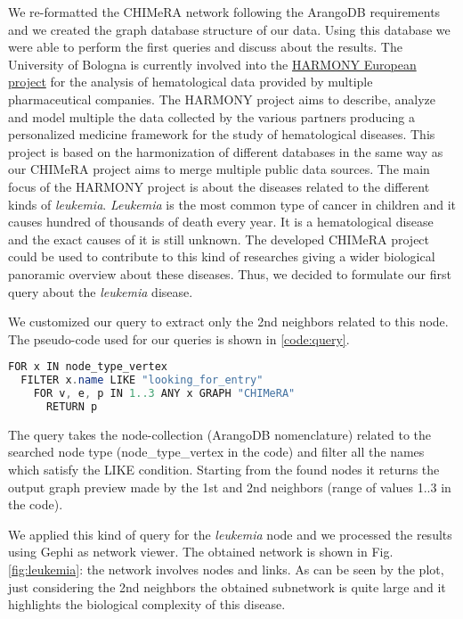 \documentclass{standalone}
\begin{document}
We re-formatted the \textsf{CHIMeRA} network following the \textsf{ArangoDB} requirements and we created the graph database structure of our data.
Using this database we were able to perform the first queries and discuss about the results.
The University of Bologna is currently involved into the \href{https://www.harmony-alliance.eu/}{HARMONY European project} for the analysis of hematological data provided by multiple pharmaceutical companies.
The HARMONY project aims to describe, analyze and model multiple the data collected by the various partners producing a personalized medicine framework for the study of hematological diseases.
This project is based on the harmonization of different databases in the same way as our \textsf{CHIMeRA} project aims to merge multiple public data sources.
The main focus of the HARMONY project is about the diseases related to the different kinds of \emph{leukemia}.
\emph{Leukemia} is the most common type of cancer in children and it causes hundred of thousands of death every year.
It is a hematological disease and the exact causes of it is still unknown.
The developed \textsf{CHIMeRA} project could be used to contribute to this kind of researches giving a wider biological panoramic overview about these diseases.
Thus, we decided to formulate our first query about the \emph{leukemia} disease.

We customized our query to extract only the 2nd neighbors related to this node.
The pseudo-code used for our queries is shown in \ref{code:query}.

\lstset{style=Java}
\begin{lstlisting}[language=Java, caption=CHIMeRA 2nd neighbors query, label=code:query]
FOR x IN node_type_vertex
  FILTER x.name LIKE "looking_for_entry"
    FOR v, e, p IN 1..3 ANY x GRAPH "CHIMeRA"
      RETURN p
\end{lstlisting}

The query takes the node-collection (\textsf{ArangoDB} nomenclature) related to the searched node type (\textsf{node\_type\_vertex} in the code) and filter all the names which satisfy the \textsf{LIKE} condition.
Starting from the found nodes it returns the output graph preview made by the 1st and 2nd neighbors (range of values \textsf{1..3} in the code).

We applied this kind of query for the \emph{leukemia} node and we processed the results using \textsf{Gephi} as network viewer.
The obtained network is shown in Fig.\ref{fig:leukemia}: the network involves  nodes and  links.
As can be seen by the plot, just considering the 2nd neighbors the obtained subnetwork is quite large and it highlights the biological complexity of this disease.
\end{document}
